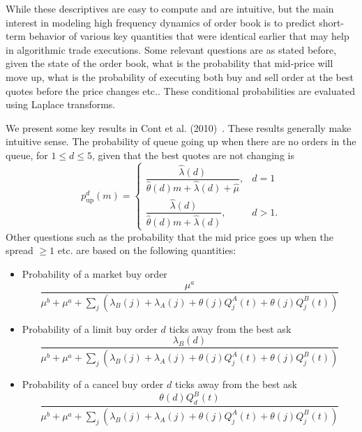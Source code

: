 While these descriptives are easy to compute and are intuitive, but the main interest in modeling high frequency dynamics of order book is to predict short-term behavior of various key quantities that were identical earlier that may help in algorithmic trade executions. Some relevant questions are as stated before, given the state of the order book, what is the probability that mid-price will move up, what is the probability of executing both buy and sell order at the best quotes before the price changes etc.. These conditional probabilities are evaluated using Laplace transforms.


We present some key results in Cont et al. (2010)~\cite{contstoi}. These results generally make intuitive sense. The probability of queue going up when there are no orders in the queue, for $1 \leq d \leq 5$, given that the best quotes are not changing is
	\begin{equation}\label{eqn:queuecon}
	p_{\text{up}}^d(m)=
	\begin{cases}
	\dfrac{\hat{\lambda}(d)}{\hat{\theta}(d)m+\hat{\lambda}(d)+\hat{\mu}}, & d=1 \\
	\dfrac{\hat{\lambda}(d)}{\hat{\theta}(d)m+\hat{\lambda}(d)}, & d>1.
	\end{cases}
	\end{equation}
Other questions such as the probability that the mid price goes up when the spread $\geq 1$ etc. are based on the following quantities:
\begin{itemize}
\item Probability of a market buy order
	\begin{equation}\label{eqn:probmarketbuy}
	\dfrac{\mu^a}{\mu^b+\mu^a+\sum_j (\lambda_B(j)+\lambda_A(j)+\theta(j) Q_j^A(t)+\theta(j)Q_j^B(t))}
	\end{equation}
\item Probability of a limit buy order $d$ ticks away from the best ask
	\begin{equation}\label{eqn:problimitbuytick}
	\dfrac{\lambda_B(d)}{\mu^b+\mu^a+\sum_j(\lambda_B(j)+\lambda_A(j)+\theta(j)Q_j^A(t)+\theta(j)Q_j^B(t))}
	\end{equation}
\item Probability of a cancel buy order $d$ ticks away from the best ask
	\begin{equation}\label{eqn:probcanceltick}
	\dfrac{\theta(d)Q_d^B(t)}{\mu^b+\mu^a+\sum_j(\lambda_B(j)+\lambda_A(j)+\theta(j)Q_j^A(t)+\theta(j)Q_j^B(t))}
	\end{equation}
\end{itemize}
